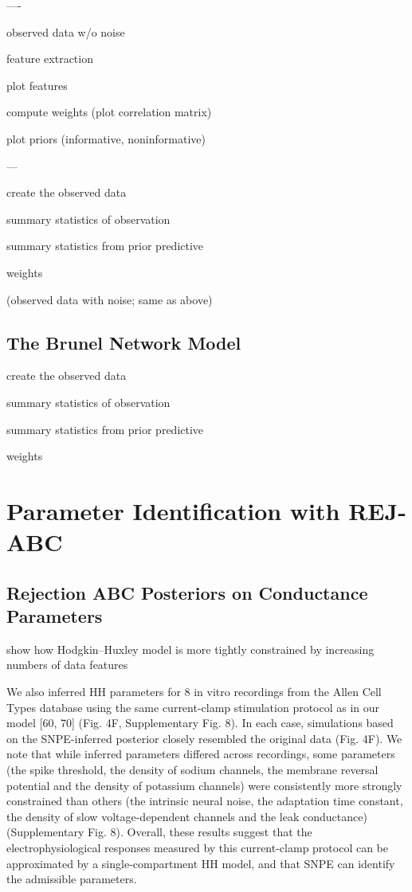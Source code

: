 ----

observed data w/o noise 

feature extraction 

plot features 

compute weights (plot correlation matrix) 

plot priors (informative, noninformative)


---

create the observed data

summary statistics of observation 

summary statistics from prior predictive

weights

(observed data with noise; same as above)

\section{The Brunel Network Model}

create the observed data

summary statistics of observation 

summary statistics from prior predictive

weights


\chapter{Parameter Identification with REJ-ABC}

\section{Rejection ABC Posteriors on Conductance Parameters}

show how Hodgkin–Huxley model is more tightly constrained by increasing numbers of data features

We also inferred HH parameters for 8 in vitro recordings from the Allen Cell Types database using the same current-clamp stimulation protocol as in our model [60, 70] (Fig. 4F, Supplementary Fig. 8). In each case, simulations based on the SNPE-inferred posterior closely resembled the original data (Fig. 4F). We note that while inferred parameters differed across recordings, some parameters (the spike threshold, the density of sodium channels, the membrane reversal potential and the density of potassium channels) were consistently more strongly constrained than others (the intrinsic neural noise, the adaptation time constant, the density of slow voltage-dependent channels and the leak conductance) (Supplementary Fig. 8). Overall, these results suggest that the electrophysiological responses measured by this current-clamp protocol can be approximated by a single-compartment HH model, and that SNPE can identify the admissible parameters.

